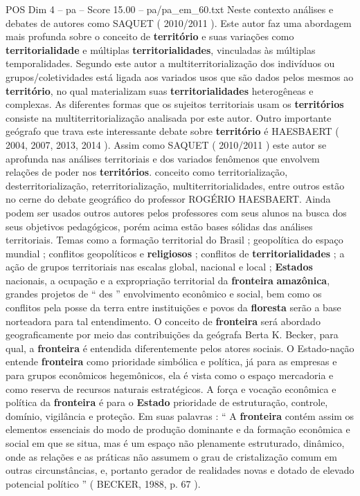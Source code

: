 \begin{textsample}{POS Dim 4 – pa – Score 15.00 – pa/pa\_em\_60.txt}
Neste contexto análises e debates de autores como SAQUET ( 2010/2011 ).
Este autor faz uma abordagem mais profunda sobre o conceito de \textbf{território} e suas variações como \textbf{territorialidade} e múltiplas \textbf{territorialidades}, vinculadas às múltiplas temporalidades.
Segundo este autor a multiterritorialização dos indivíduos ou grupos/coletividades está ligada aos variados usos que são dados pelos mesmos ao \textbf{território}, no qual materializam suas \textbf{territorialidades} heterogêneas e complexas.
As diferentes formas que os sujeitos territoriais usam os \textbf{territórios} consiste na multiterritorialização analisada por este autor.
Outro importante geógrafo que trava este interessante debate sobre \textbf{território} é HAESBAERT ( 2004, 2007, 2013, 2014 ).
Assim como SAQUET ( 2010/2011 ) este autor se aprofunda nas análises territoriais e dos variados fenômenos que envolvem relações de poder nos \textbf{territórios}. conceito como territorialização, desterritorialização, reterritorialização, multiterritorialidades, entre outros estão no cerne do debate geográfico do professor ROGÉRIO HAESBAERT.
Ainda podem ser usados outros autores pelos professores com seus alunos na busca dos seus objetivos pedagógicos, porém acima estão bases sólidas das análises territoriais.
Temas como a formação territorial do Brasil ; geopolítica do espaço mundial ; conflitos geopolíticos e \textbf{religiosos} ; conflitos de \textbf{territorialidades} ; a ação de grupos territoriais nas escalas global, nacional e local ; \textbf{Estados} nacionais, a ocupação e a expropriação territorial da \textbf{fronteira} \textbf{amazônica}, grandes projetos de “ des ” envolvimento econômico e social, bem como os conflitos pela posse da terra entre instituições e povos da \textbf{floresta} serão a base norteadora para tal entendimento.
O conceito de \textbf{fronteira} será abordado geograficamente por meio das contribuições da geógrafa Berta K.
Becker, para qual, a \textbf{fronteira} é entendida diferentemente pelos atores sociais.
O Estado-nação entende \textbf{fronteira} como prioridade simbólica e política, já para as empresas e para grupos econômicos hegemônicos, ela é vista como o espaço mercadoria e como reserva de recursos naturais estratégicos.
A força e vocação econômica e política da \textbf{fronteira} é para o \textbf{Estado} prioridade de estruturação, controle, domínio, vigilância e proteção.
Em suas palavras : “ A \textbf{fronteira} contém assim os elementos essenciais do modo de produção dominante e da formação econômica e social em que se situa, mas é um espaço não plenamente estruturado, dinâmico, onde as relações e as práticas não assumem o grau de cristalização comum em outras circunstâncias, e, portanto gerador de realidades novas e dotado de elevado potencial político ” ( BECKER, 1988, p. 67 ).

\end{textsample}
